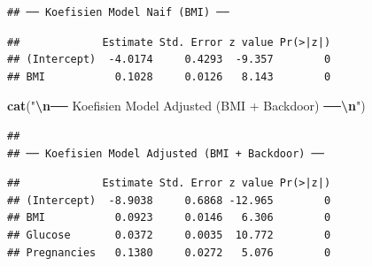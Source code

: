 \documentclass[
  11pt,
]{article}
\newenvironment{Shaded}{\begin{snugshade}}{\end{snugshade}}
\newcommand{\DecValTok}[1]{\textcolor[rgb]{0.00,0.00,0.81}{#1}}
\newcommand{\FunctionTok}[1]{\textcolor[rgb]{0.13,0.29,0.53}{\textbf{#1}}}
\newcommand{\NormalTok}[1]{#1}
\newcommand{\SpecialCharTok}[1]{\textcolor[rgb]{0.81,0.36,0.00}{\textbf{#1}}}
\newcommand{\StringTok}[1]{\textcolor[rgb]{0.31,0.60,0.02}{#1}}
\begin{document}
\begin{verbatim}
## ── Koefisien Model Naif (BMI) ──
\end{verbatim}

\begin{Shaded}
\end{Shaded}

\begin{verbatim}
##             Estimate Std. Error z value Pr(>|z|)
## (Intercept)  -4.0174     0.4293  -9.357        0
## BMI           0.1028     0.0126   8.143        0
\end{verbatim}

\begin{Shaded}
\begin{Highlighting}[]
\FunctionTok{cat}\NormalTok{(}\StringTok{"}\SpecialCharTok{\textbackslash{}n}\StringTok{── Koefisien Model Adjusted (BMI + Backdoor) ──}\SpecialCharTok{\textbackslash{}n}\StringTok{"}\NormalTok{)}
\end{Highlighting}
\end{Shaded}

\begin{verbatim}
## 
## ── Koefisien Model Adjusted (BMI + Backdoor) ──
\end{verbatim}

\begin{Shaded}
\end{Shaded}

\begin{verbatim}
##             Estimate Std. Error z value Pr(>|z|)
## (Intercept)  -8.9038     0.6868 -12.965        0
## BMI           0.0923     0.0146   6.306        0
## Glucose       0.0372     0.0035  10.772        0
## Pregnancies   0.1380     0.0272   5.076        0
\end{verbatim}
\end{document}
